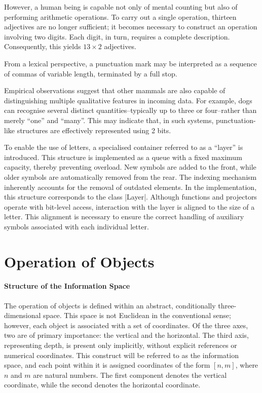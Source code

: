 \documentclass[12pt, a4paper]{article}
\begin{document}
However, a human being is capable not only of mental counting but also of performing 
arithmetic operations. To carry out a single operation, thirteen adjectives are no 
longer sufficient; it becomes necessary to construct an operation involving two 
digits. Each digit, in turn, requires a complete description. Consequently, this 
yields $13 \times 2$ adjectives.

From a lexical perspective, a punctuation mark may be interpreted as a sequence of commas 
of variable length, terminated by a full stop.

Empirical observations suggest that other mammals are also capable of distinguishing 
multiple qualitative features in incoming data. For example, dogs can recognise several 
distinct quantities--typically up to three or four--rather than merely ``one'' and 
``many''\cite{psychologytodayDogsKnow}. This may indicate that, in such systems, 
punctuation-like structures are effectively represented using 2 bits.

To enable the use of letters, a specialised container referred to as a ``layer'' 
is introduced. This structure is implemented as a queue with a fixed maximum capacity, 
thereby preventing overload. New symbols are added to the front, while older symbols 
are automatically removed from the rear. The indexing mechanism inherently accounts for 
the removal of outdated elements. In the implementation, this structure corresponds to the 
class |Layer|. Although functions and projectors operate with bit-level access, interaction 
with the layer is aligned to the size of a letter. This alignment is necessary to ensure 
the correct handling of auxiliary symbols associated with each individual letter.

\section{Operation of Objects}

\paragraph{Structure of the Information Space}

The operation of objects is defined within an abstract, conditionally three-dimensional 
space. This space is not Euclidean in the conventional sense; however, each object is 
associated with a set of coordinates. Of the three axes, two are of primary importance: 
the vertical and the horizontal. The third axis, representing depth, is present only 
implicitly, without explicit references or numerical coordinates. This construct 
will be referred to as the information space, and each point within it is assigned 
coordinates of the form $[n,m]$, where $n$ and $m$ are natural numbers. The first component 
denotes the vertical coordinate, while the second denotes the horizontal coordinate.
\end{document}
